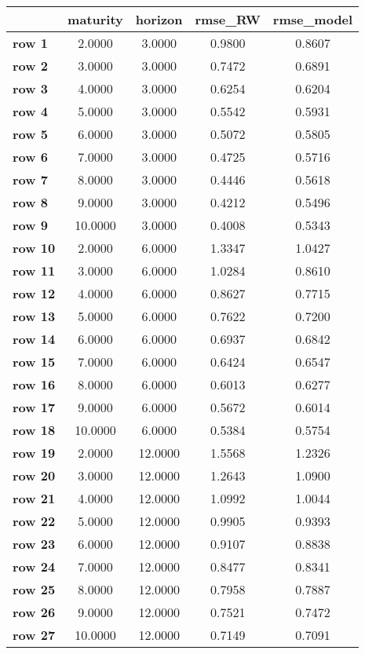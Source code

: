 \begin{tiny}\begin{tabular}{|l|c|c|c|c|}
\hline
&\textbf{maturity}&\textbf{horizon}&\textbf{rmse_RW}&\textbf{rmse_model}\\\hline
\textbf{row 1}&2.0000&3.0000&0.9800&0.8607\\\hline
\textbf{row 2}&3.0000&3.0000&0.7472&0.6891\\\hline
\textbf{row 3}&4.0000&3.0000&0.6254&0.6204\\\hline
\textbf{row 4}&5.0000&3.0000&0.5542&0.5931\\\hline
\textbf{row 5}&6.0000&3.0000&0.5072&0.5805\\\hline
\textbf{row 6}&7.0000&3.0000&0.4725&0.5716\\\hline
\textbf{row 7}&8.0000&3.0000&0.4446&0.5618\\\hline
\textbf{row 8}&9.0000&3.0000&0.4212&0.5496\\\hline
\textbf{row 9}&10.0000&3.0000&0.4008&0.5343\\\hline
\textbf{row 10}&2.0000&6.0000&1.3347&1.0427\\\hline
\textbf{row 11}&3.0000&6.0000&1.0284&0.8610\\\hline
\textbf{row 12}&4.0000&6.0000&0.8627&0.7715\\\hline
\textbf{row 13}&5.0000&6.0000&0.7622&0.7200\\\hline
\textbf{row 14}&6.0000&6.0000&0.6937&0.6842\\\hline
\textbf{row 15}&7.0000&6.0000&0.6424&0.6547\\\hline
\textbf{row 16}&8.0000&6.0000&0.6013&0.6277\\\hline
\textbf{row 17}&9.0000&6.0000&0.5672&0.6014\\\hline
\textbf{row 18}&10.0000&6.0000&0.5384&0.5754\\\hline
\textbf{row 19}&2.0000&12.0000&1.5568&1.2326\\\hline
\textbf{row 20}&3.0000&12.0000&1.2643&1.0900\\\hline
\textbf{row 21}&4.0000&12.0000&1.0992&1.0044\\\hline
\textbf{row 22}&5.0000&12.0000&0.9905&0.9393\\\hline
\textbf{row 23}&6.0000&12.0000&0.9107&0.8838\\\hline
\textbf{row 24}&7.0000&12.0000&0.8477&0.8341\\\hline
\textbf{row 25}&8.0000&12.0000&0.7958&0.7887\\\hline
\textbf{row 26}&9.0000&12.0000&0.7521&0.7472\\\hline
\textbf{row 27}&10.0000&12.0000&0.7149&0.7091\\\hline
\end{tabular}
\end{tiny}